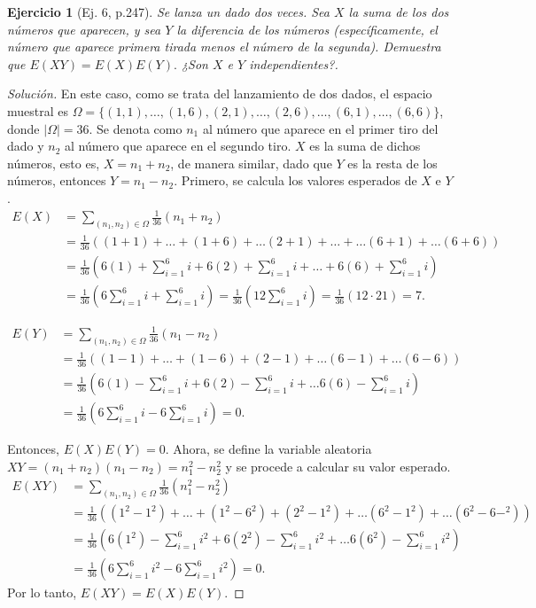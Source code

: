 \documentclass[12pt,letterpaper]{article}
\newtheorem{ej}{Ejercicio}
\begin{document}
\begin{ej}[Ej. 6, p.247]
Se lanza un dado dos veces. Sea $X$ la suma de los dos números que aparecen, y sea $Y$ la diferencia de los números (específicamente, el número que aparece primera tirada menos el número de la segunda). Demuestra que $E(XY)=E(X)E(Y).$ ¿Son $X$ e $Y$ independientes?.
\end{ej}
\begin{proof}[Solución] En este caso, como se trata del lanzamiento de dos dados, el espacio muestral es $\Omega = \{(1,1), \ldots , (1,6), (2,1), \ldots , (2,6), \ldots , (6,1), \ldots , (6,6)\}$, donde $|\Omega| = 36$. Se denota como $n_1$ al número que aparece en el primer tiro del dado y $n_2$ al número que aparece en el segundo tiro. $X$ es la suma de dichos números, esto es, $X=n_1 + n_2$, de manera similar, dado que $Y$ es la resta de los números, entonces $Y=n_1 - n_2$. Primero, se calcula los valores esperados de $X$ e $Y$.
\begin{align}
E(X) &=\sum_{(n_1,n_2) \in \Omega} \frac{1}{36} (n_1 + n_2) \\&= \frac{1}{36} \left( (1+1) + \ldots + (1+6) + \ldots (2+1) + \ldots + \ldots (6+1) + \ldots (6+6) \right)\\ &= \frac{1}{36}\left( 6(1) + \sum_{i=1}^6 i + 6(2) + \sum_{i=1}^6 i + \ldots + 6(6) + \sum_{i=1}^6 i \right)\\ &= \frac{1}{36} \left( 6 \sum_{i=1}^6 i + \sum_{i=1}^6 i\right) = \frac{1}{36}\left( 12 \sum_{i=1}^6 i \right) = \frac{1}{36} (12 \cdot 21) = 7.
\end{align}

\begin{align}
E(Y) &= \sum_{(n_1,n_2) \in \Omega} \frac{1}{36} (n_1 - n_2) \\ &=\frac{1}{36} \left( (1-1) + \ldots + (1-6) + (2-1) + \ldots (6-1)+\ldots (6-6)\right) \\ &= \frac{1}{36} \left( 6(1) - \sum_{i=1}^6 i + 6(2) - \sum_{i=1}^6 i +\ldots 6(6) - \sum_{i=1}^6 i \right) \\ &= \frac{1}{36} \left( 6 \sum_{i=1}^6 i - 6 \sum_{i=1}^6 i \right) =0.
\end{align}

Entonces, $E(X)E(Y)=0$. Ahora, se define la variable aleatoria $XY = (n_1 + n_2)(n_1 - n_2) = n_1^2 - n_2^2$ y se procede a calcular su valor esperado.
\begin{align}
E(	XY) &= \sum_{(n_1,n_2) \in \Omega} \frac{1}{36} (n_1^2 - n_2^2) \\ &=\frac{1}{36} \left( (1^2-1^2) + \ldots + (1^2-6^2) + (2^2-1^2) + \ldots (6^2-1^2)+\ldots (6^2-6-^2)\right) \\ &= \frac{1}{36} \left( 6(1^2) - \sum_{i=1}^6 i^2 + 6(2^2) - \sum_{i=1}^6 i^2 +\ldots 6(6^2) - \sum_{i=1}^6 i^2 \right) \\ &= \frac{1}{36} \left( 6 \sum_{i=1}^6 i^2 - 6 \sum_{i=1}^6 i ^2\right) =0.
\end{align}
Por lo tanto, $E(XY)=E(X)E(Y)$.


\end{proof}
\end{document}
